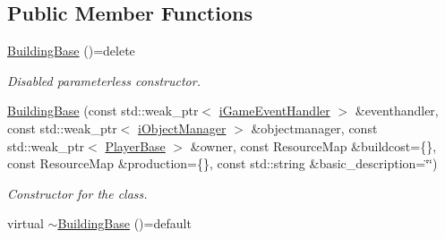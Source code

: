 \subsection*{Public Member Functions}
\begin{DoxyCompactItemize}
\item 
\hypertarget{class_course_1_1_building_base_a899534ce249e7bd1c55883b7c0f4db93}{\hyperlink{class_course_1_1_building_base_a899534ce249e7bd1c55883b7c0f4db93}{Building\-Base} ()=delete}\label{class_course_1_1_building_base_a899534ce249e7bd1c55883b7c0f4db93}

\begin{DoxyCompactList}\small\item\em Disabled parameterless constructor. \end{DoxyCompactList}\item 
\hyperlink{class_course_1_1_building_base_a23b962cc4a1181055974897623260a9c}{Building\-Base} (const std\-::weak\-\_\-ptr$<$ \hyperlink{class_course_1_1i_game_event_handler}{i\-Game\-Event\-Handler} $>$ \&eventhandler, const std\-::weak\-\_\-ptr$<$ \hyperlink{class_course_1_1i_object_manager}{i\-Object\-Manager} $>$ \&objectmanager, const std\-::weak\-\_\-ptr$<$ \hyperlink{class_course_1_1_player_base}{Player\-Base} $>$ \&owner, const Resource\-Map \&buildcost=\{\}, const Resource\-Map \&production=\{\}, const std\-::string \&basic\-\_\-description=\char`\"{}\char`\"{})
\begin{DoxyCompactList}\small\item\em Constructor for the class. \end{DoxyCompactList}\item 
\hypertarget{class_course_1_1_building_base_aa1787cfb58ab07902c29fe02941dced6}{virtual \hyperlink{class_course_1_1_building_base_aa1787cfb58ab07902c29fe02941dced6}{$\sim$\-Building\-Base} ()=default}\label{class_course_1_1_building_base_aa1787cfb58ab07902c29fe02941dced6}


\end{DoxyCompactItemize}
